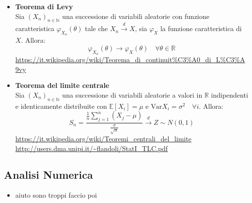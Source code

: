 \documentclass[12pt,a4paper]{report}
\begin{document}
\begin{itemize}
\item \textbf{Teorema di Levy}\\
Sia \( \left(X_{n}\right)_{n \in \mathbb{N}} \) una successione di variabili aleatorie con funzione caratteristica \( \varphi_{X_{n}}(\theta)\) tale che \(X_{n} \stackrel{d}{\to} X \), sia \(\varphi_{X}\) la funzione caratteristica di \(X\). Allora:
\[ \varphi_{X_{n}}(\theta) \to \varphi_{X}(\theta) \quad \forall \theta \in \mathbb{R} \]
\url{https://it.wikipedia.org/wiki/Teorema_di_continuit%C3%A0_di_L%C3%A9vy}

\item \textbf{Teorema del limite centrale}\\
Sia \( \left(X_{n}\right)_{n \in \mathbb{N}} \) una successione di variabili aleatorie a valori in \(\mathbb{R}\) indipendenti e identicamente distribuite con  \( \mathbb{E}[X_i]=\mu\) e \(\mbox{Var}X_i=\sigma^2 \quad \forall i\). Allora:
\[ S_{n}={\frac {\frac{1}{n}\sum _{j=1}^{n} \left(X_{j}-\mu\right) }{\frac{\sigma} {\sqrt {n}}}} \stackrel{d}{\longrightarrow} Z \sim N(0,1) \]
\url{https://it.wikipedia.org/wiki/Teoremi_centrali_del_limite}\\
\url{http://users.dma.unipi.it/~flandoli/StatI_TLC.pdf}
\end{itemize}


\newpage
\subsection*{Analisi Numerica}
\begin{itemize}
\item aiuto sono troppi faccio poi
\end{itemize}
\end{document}
